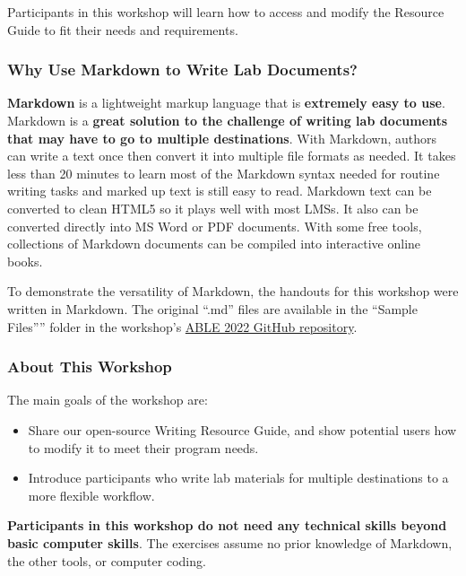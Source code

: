 \documentclass[
]{article}
\providecommand{\tightlist}{%
  \setlength{\itemsep}{0pt}\setlength{\parskip}{0pt}}
\begin{document}
Participants in this workshop will learn how to access and modify the
Resource Guide to fit their needs and requirements.

\hypertarget{why-use-markdown-to-write-lab-documents}{%
\subsubsection{Why Use Markdown to Write Lab
Documents?}\label{why-use-markdown-to-write-lab-documents}}

\textbf{Markdown} is a lightweight markup language that is
\textbf{extremely easy to use}. Markdown is a \textbf{great solution to
the challenge of writing lab documents that may have to go to multiple
destinations}. With Markdown, authors can write a text once then convert
it into multiple file formats as needed. It takes less than 20 minutes
to learn most of the Markdown syntax needed for routine writing tasks
and marked up text is still easy to read. Markdown text can be converted
to clean HTML5 so it plays well with most LMSs. It also can be converted
directly into MS Word or PDF documents. With some free tools,
collections of Markdown documents can be compiled into interactive
online books.

To demonstrate the versatility of Markdown, the handouts for this
workshop were written in Markdown. The original ``.md'' files are
available in the ``Sample Files'''' folder in the workshop's
\href{https://github.com/adanieljohnson/ABLE_2022_Workshop}{ABLE 2022
GitHub repository}.

\hypertarget{about-this-workshop}{%
\subsubsection{About This Workshop}\label{about-this-workshop}}

The main goals of the workshop are:

\begin{itemize}
\tightlist
\item
  Share our open-source Writing Resource Guide, and show potential users
  how to modify it to meet their program needs.
\item
  Introduce participants who write lab materials for multiple
  destinations to a more flexible workflow.
\end{itemize}

\textbf{Participants in this workshop do not need any technical skills
beyond basic computer skills}. The exercises assume no prior knowledge
of Markdown, the other tools, or computer coding.
\end{document}
